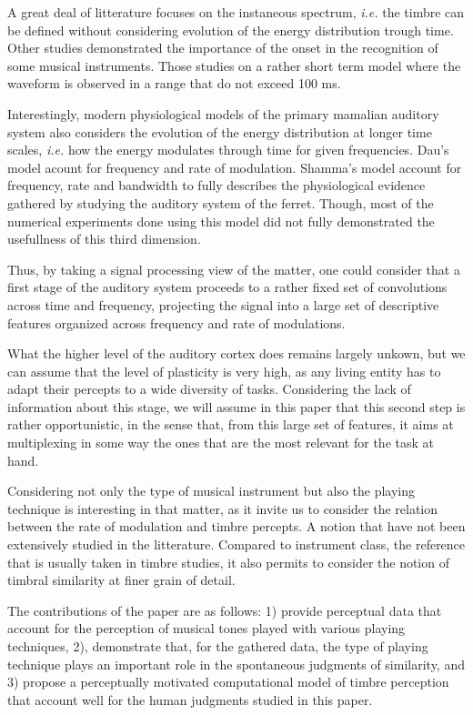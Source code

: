 \documentclass{article}
\begin{document}
A great deal of litterature focuses on the instaneous spectrum, \textit{i.e.} the timbre can be defined without considering evolution of the energy distribution trough time. Other studies demonstrated the importance of the onset in the recognition of some musical instruments. Those studies on a rather short term model where the waveform is observed in a range that do not exceed 100 ms.

Interestingly, modern physiological models of the primary mamalian auditory system also considers the evolution of the energy distribution at longer time scales, \textit{i.e.} how the energy modulates through time for given frequencies.  Dau's model acount for frequency and rate of modulation. Shamma's model account for frequency, rate and bandwidth to fully describes the physiological evidence gathered by studying the auditory system of the ferret. Though, most of the numerical experiments done using this model did not fully demonstrated the usefullness of this third dimension.

Thus, by taking a signal processing view of the matter, one could consider that a first stage of the auditory system proceeds to a rather fixed set of convolutions across time and frequency, projecting the signal into a large set of descriptive features organized across frequency and rate of modulations.

What the higher level of the auditory cortex does remains largely unkown, but we can assume that the level of plasticity is very high, as any living entity has to adapt their percepts to a wide diversity of tasks.  Considering the lack of information about this stage, we will assume in this paper that this second step is rather opportunistic, in the sense that, from this large set of features, it aims at multiplexing in some way the ones that are the most relevant for the task at hand.

Considering not only the type of musical instrument but also the playing technique is interesting in that matter, as it invite us to consider the relation between the rate of modulation and timbre percepts. A notion that have not been extensively studied in the litterature. Compared to instrument class, the reference that is usually taken in timbre studies, it also permits to consider the notion of timbral similarity at finer grain of detail.

The contributions of the paper are as follows: 1) provide perceptual data that account for the perception of musical tones played with various playing techniques, 2), demonstrate that, for the gathered data, the type of playing technique plays an important role in the spontaneous judgments of similarity, and 3) propose a perceptually motivated computational model of timbre perception that account well for the human judgments studied in this paper.
\end{document}
